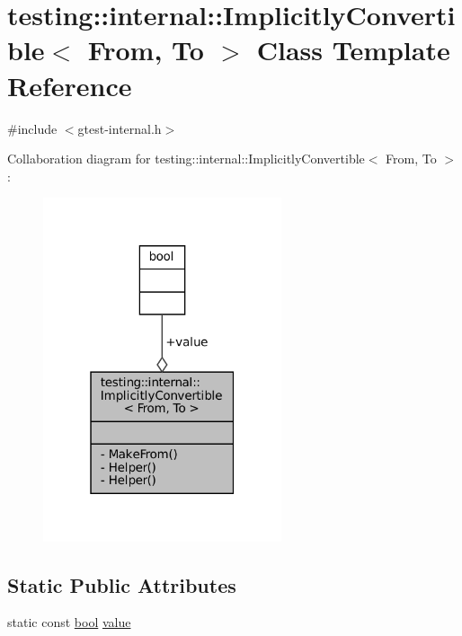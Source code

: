 \hypertarget{classtesting_1_1internal_1_1ImplicitlyConvertible}{}\section{testing\+:\+:internal\+:\+:Implicitly\+Convertible$<$ From, To $>$ Class Template Reference}
\label{classtesting_1_1internal_1_1ImplicitlyConvertible}


{\ttfamily \#include $<$gtest-\/internal.\+h$>$}



Collaboration diagram for testing\+:\+:internal\+:\+:Implicitly\+Convertible$<$ From, To $>$\+:
\nopagebreak
\begin{figure}[H]
\begin{center}
\leavevmode
\includegraphics[width=199pt]{classtesting_1_1internal_1_1ImplicitlyConvertible__coll__graph}
\end{center}
\end{figure}
\subsection*{Static Public Attributes}
\begin{DoxyCompactItemize}
\item 
static const \hyperlink{classbool}{bool} \hyperlink{classtesting_1_1internal_1_1ImplicitlyConvertible_aea51cecabca681fb75659e224771b7b7}{value}
\end{DoxyCompactItemize}
